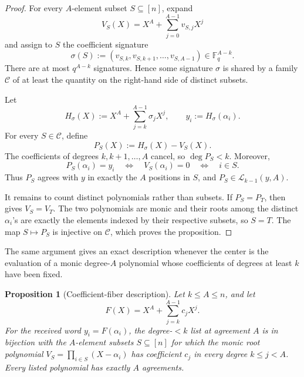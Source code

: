 \documentclass[11pt,letterpaper]{article}
\newtheorem{proposition}[proposition]{Proposition}
\theoremstyle{definition}
\newcommand{\F}{\mathbb{F}}
\newcommand{\List}{\mathcal{L}}
\begin{document}
\begin{proof}
For every \(A\)-element subset \(S\subseteq[n]\), expand
\begin{equation}
  V_S(X)=X^A+\sum_{j=0}^{A-1}v_{S,j}X^j
  \label{eq:vanishing-polynomial-coefficients}
\end{equation}
and assign to \(S\) the coefficient signature
\begin{equation}
  \sigma(S):=(v_{S,k},v_{S,k+1},\ldots,v_{S,A-1})
  \in\F_q^{A-k}.
  \label{eq:high-coefficient-signature}
\end{equation}
There are at most \(q^{A-k}\) signatures.  Hence some signature \(\sigma\)
is shared by a family \(\mathcal C\) of at least the quantity on the
right-hand side of  distinct subsets.

Let
\begin{equation}
  H_\sigma(X):=X^A+\sum_{j=k}^{A-1}\sigma_jX^j,
  \qquad
  y_i:=H_\sigma(\alpha_i).
  \label{eq:bad-ball-center-polynomial}
\end{equation}
For every \(S\in\mathcal C\), define
\begin{equation}
  P_S(X):=H_\sigma(X)-V_S(X).
  \label{eq:bad-ball-message-polynomial}
\end{equation}
The coefficients of degrees \(k,k+1,\ldots,A\) cancel, so
\(\deg P_S<k\).  Moreover,
\[
  P_S(\alpha_i)=y_i
  \quad\Longleftrightarrow\quad
  V_S(\alpha_i)=0
  \quad\Longleftrightarrow\quad
  i\in S.
\]
Thus \(P_S\) agrees with \(y\) in exactly the \(A\) positions in \(S\), and
\(P_S\in\List_{k-1}(y,A)\).

It remains to count distinct polynomials rather than subsets.  If
\(P_S=P_T\), then  gives \(V_S=V_T\).
The two polynomials are monic and their roots among the distinct
\(\alpha_i\)'s are exactly the elements indexed by their respective subsets,
so \(S=T\).  The map \(S\mapsto P_S\) is injective on \(\mathcal C\), which
proves the proposition.
\end{proof}

The same argument gives an exact description whenever the center is the
evaluation of a monic degree-$A$ polynomial whose coefficients of degrees
at least $k$ have been fixed.

\begin{proposition}[Coefficient-fiber description]
\label{prop:coefficient-fiber}
Let $k\le A\le n$, and let
\[
  F(X)=X^A+\sum_{j=k}^{A-1}c_jX^j.
\]
For the received word $y_i=F(\alpha_i)$, the degree-$<k$ list at
agreement $A$ is in bijection with the $A$-element subsets
$S\subseteq[n]$ for which the monic root polynomial
$V_S=\prod_{i\in S}(X-\alpha_i)$ has coefficient $c_j$ in every degree
$k\le j<A$. Every listed polynomial has exactly $A$ agreements.
\end{proposition}
\end{document}
